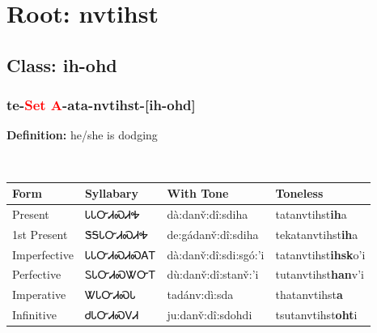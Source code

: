 \needspace{4in}
\section*{Root: nvtihst}
\nopagebreak
{}
\needspace{3in}
\subsection*{Class: ih-ohd}
\nopagebreak
\needspace{2in}
\subsubsection*{te{-}\textcolor{Red}{Set A}{-}ata{-}\textbf{nvtihst}{-}[ih-ohd]}
\nopagebreak
\textbf{Definition: } he/she is dodging
\\[0.5em]
\begin{tabularx}{\textwidth}{l X X X}%
\toprule%
\textbf{Form}&\textbf{Syllabary}&\textbf{With Tone}&\textbf{Toneless}\\%
\midrule%
Present&ᏓᏓᏅᏗᏍᏗᎭ&dà:danv̌:dî:sdiha&tatanvtihst\textbf{ih}a\\%
1st Present&ᏕᎦᏓᏅᏗᏍᏗᎭ&de:gádanv̌:dî:sdiha&tekatanvtihst\textbf{ih}a\\%
Imperfective&ᏓᏓᏅᏗᏍᏗᏍᎪᎢ&dà:danv̌:dî:sdi:sgó:’i&tatanvtihst\textbf{ihsk}o'i\\%
Perfective&ᏚᏓᏅᏗᏍᏔᏅᎢ&dù:danv̌:dî:stanv̌:’i&tutanvtihst\textbf{han}v'i\\%
Imperative&ᏔᏓᏅᏗᏍᏓ&tadánv:dì:sda&thatanvtihst\textbf{a}\\%
Infinitive&ᏧᏓᏅᏗᏍᏙᏗ&ju:danv̌:dî:sdohdi&tsutanvtihst\textbf{oht}i\\%
\bottomrule%
\end{tabularx}
\\[1em]